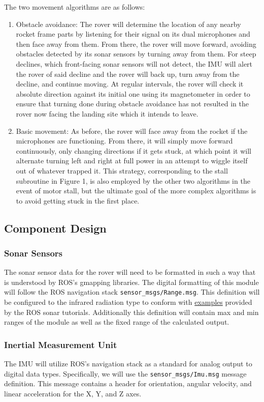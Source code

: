 \documentclass[onecolumn, draftclsnofoot,10pt, compsoc]{IEEEtran}
\def\code#1{\texttt{#1}}
\begin{document}
The two movement algorithms are as follows:
\begin{enumerate}
\item Obstacle avoidance: The rover will determine the location of any nearby rocket frame parts by listening for their signal on its dual microphones and then face away from them. From there, the rover will move forward, avoiding obstacles detected by its sonar sensors by turning away from them. For steep declines, which front-facing sonar sensors will not detect, the IMU will alert the rover of said decline and the rover will back up, turn away from the decline, and continue moving. At regular intervals, the rover will check it absolute direction against its initial one using its magnetometer in order to ensure that turning done during obstacle avoidance has not resulted in the rover now facing the landing site which it intends to leave.
\item Basic movement: As before, the rover will face away from the rocket if the microphones are functioning. From there, it will simply move forward continuously, only changing directions if it gets stuck, at which point it will alternate turning left and right at full power in an attempt to wiggle itself out of whatever trapped it. This strategy, corresponding to the stall subroutine in Figure 1, is also employed by the other two algorithms in the event of motor stall, but the ultimate goal of the more complex algorithms is to avoid getting stuck in the first place.
\end{enumerate}
\subsection{Component Design}
\subsubsection{Sonar Sensors}
The sonar sensor data for the rover will need to be formatted in such a way that is understood by ROS's gmapping libraries. The digital formatting of this module will follow the ROS navigation stack \code{sensor\_msgs/Range.msg}. This definition will be configured to the infrared radiation type to conform with \href{http://wiki.ros.org/Robots/evarobot/Tutorials/indigo/Sonar}{examples} provided by the ROS sonar tutorials. Additionally this definition will contain max and min ranges of the module as well as the fixed range of the calculated output.
\subsubsection{Inertial Measurement Unit}
The IMU will utilize ROS's navigation stack as a standard for analog output to digital data types. Specifically, we will use the \code{sensor\_msgs/Imu.msg} message definition. This message contains a header for orientation, angular velocity, and linear acceleration for the X, Y, and Z axes.
\end{document}
